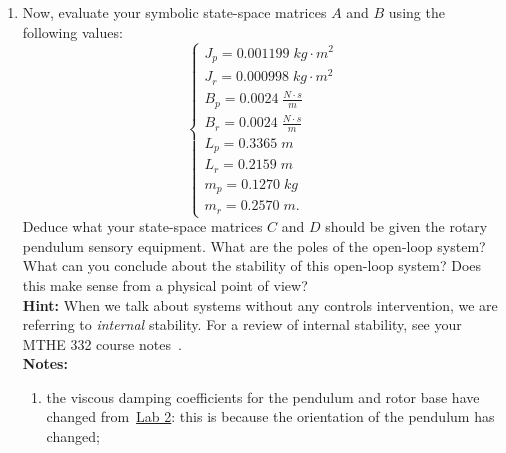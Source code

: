 \documentclass[12pt]{report}
\begin{document}
\begin{enumerate}
    \item Now, evaluate your symbolic state-space matrices $A$ and $B$ using the following values:
          \[
              \begin{cases}
                  J_p = 0.001199 \; kg \cdot m^2     \\
                  J_r = 0.000998 \; kg \cdot m^2     \\
                  B_p = 0.0024 \; \frac{N\cdot s}{m} \\
                  B_r = 0.0024 \; \frac{N\cdot s}{m} \\
                  L_p = 0.3365 \; m                  \\
                  L_r = 0.2159 \; m                  \\
                  m_p = 0.1270 \; kg                 \\
                  m_r = 0.2570 \; m.
              \end{cases}
          \]
          Deduce what your state-space matrices $C$ and $D$ should be given the rotary pendulum sensory equipment. What are the poles of the open-loop system? What can you conclude about the stability of this open-loop system? Does this make sense from a physical point of view?\\
          \textbf{Hint:} When we talk about systems without any controls intervention, we are referring to \emph{internal} stability. For a review of internal stability, see your MTHE 332 course notes~\cite[p. 162]{AL:04}.\\
          \textbf{Notes:} \begin{enumerate}
              \item the viscous damping coefficients for the pendulum and rotor base have changed from~\hyperref[lab2:linearization_validity]{Lab 2}: this is because the orientation of the pendulum has changed;

\end{enumerate}
\end{enumerate}
\end{document}

